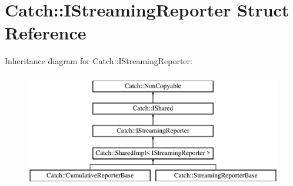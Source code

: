 \hypertarget{struct_catch_1_1_i_streaming_reporter}{\section{Catch\-:\-:I\-Streaming\-Reporter Struct Reference}
\label{struct_catch_1_1_i_streaming_reporter}
}
Inheritance diagram for Catch\-:\-:I\-Streaming\-Reporter\-:\begin{figure}[H]
\begin{center}
\leavevmode
\includegraphics[height=5.000000cm]{struct_catch_1_1_i_streaming_reporter}
\end{center}
\end{figure}
